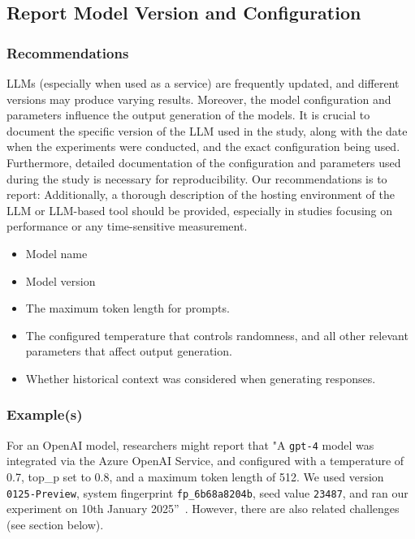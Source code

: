 \documentclass[11pt]{article}
\begin{document}
\subsection{Report Model Version and Configuration}

\subsubsection{Recommendations}

LLMs (especially when used as a service) are frequently updated, and different versions may produce varying results.
Moreover, the model configuration and parameters influence the output generation of the models.
It is crucial to document the specific version of the LLM used in the study, along with the date when the experiments were conducted, and the exact configuration being used.
Furthermore, detailed documentation of the configuration and parameters used during the study is necessary for reproducibility. 
Our recommendations is to report:
Additionally, a thorough description of the hosting environment of the LLM or LLM-based tool should be provided, especially in studies focusing on performance or any time-sensitive measurement.

\begin{itemize}
\item Model name
\item Model version
\item The maximum token length for prompts.
\item The configured temperature that controls randomness, and all other relevant parameters that affect output generation.
\item Whether historical context was considered when generating responses.
\end{itemize}


\subsubsection{Example(s)}

For an OpenAI model, researchers might report that "A  \texttt{gpt-4} model was integrated via the Azure OpenAI Service, and configured with a temperature of 0.7, top\_p set to 0.8, and a maximum token length of 512. We used version \texttt{0125-Preview}, system fingerprint \texttt{fp\_6b68a8204b}, seed value \texttt{23487}, and ran our experiment on 10th January 2025''~\cite{OpenAI25, Azure25}.
However, there are also related challenges (see section below).
\end{document}
